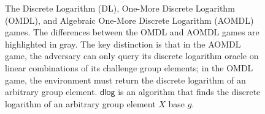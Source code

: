 \begin{figure}[t]
\begin{pchstack}[boxed,center,space=1em]
\begin{pchstack}
  \vline
      \pchspace
  \pchspace
\end{pchstack}

\end{pchstack}
    \caption{The Discrete Logarithm (DL), One-More Discrete Logarithm (OMDL), and Algebraic One-More Discrete Logarithm (AOMDL) games.
    The differences between the OMDL and AOMDL games are highlighted in gray.
    The key distinction is that in the AOMDL game,
    the adversary can only query its discrete logarithm oracle on linear combinations of its challenge group elements;
    in the OMDL game, the environment must return the discrete logarithm of an
    arbitrary group element. $\mathsf{dlog}$ is an algorithm that finds the discrete logarithm of an arbitrary group element $X$ base $g$.}
    \label{fig:dl-omdl}
    \hrulefill
\end{figure}

